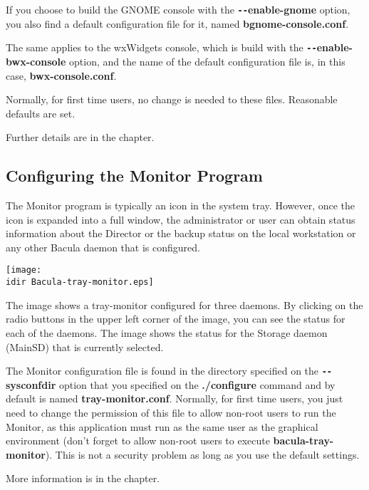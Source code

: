 If you choose to build the GNOME console with the {\bf
\verb:--:enable-gnome} option, you also find a default configuration file
for it, named {\bf bgnome-console.conf}.

The same applies to the wxWidgets console, which is build with the {\bf
\verb:--:enable-bwx-console} option, and the name of the default
configuration file is, in this case, {\bf bwx-console.conf}.

Normally, for first time users, no change is needed to these files. Reasonable
defaults are set. 

Further details are in the
 chapter.

\subsection{Configuring the Monitor Program}

The Monitor program is typically an icon in the system tray. However, once the
icon is expanded into a full window, the administrator or user can obtain
status information about the Director or the backup status on the local
workstation or any other Bacula daemon that is configured. 

\texttt{[image: \\idir Bacula-tray-monitor.eps]} 

The image shows a tray-monitor configured for three daemons. By clicking on
the radio buttons in the upper left corner of the image, you can see the
status for each of the daemons. The image shows the status for the Storage
daemon (MainSD) that is currently selected. 

The Monitor configuration file is found in the directory specified on the {\bf
\verb:--:sysconfdir} option that you specified on the {\bf ./configure} command
and
by default is named {\bf tray-monitor.conf}. Normally, for first time users,
you just need to change the permission of this file to allow non-root users to
run the Monitor, as this application must run as the same user as the
graphical environment (don't forget to allow non-root users to execute {\bf
bacula-tray-monitor}). This is not a security problem as long as you use the
default settings. 

More information is in the
 chapter.


